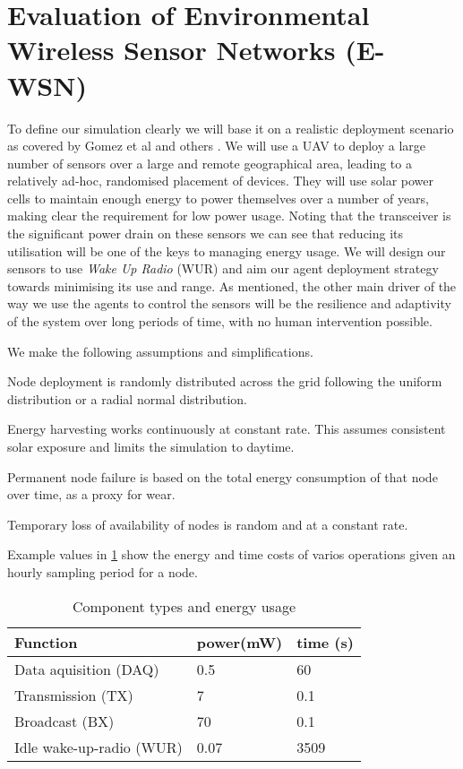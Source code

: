 \section{Evaluation of Environmental Wireless Sensor Networks (E-WSN)}
\label{section:experimental}	

To define our simulation clearly we will base it on a realistic deployment scenario as covered by Gomez et al \cite{Gomez} and others \cite{Jha2016, Avram}. We will use a UAV to deploy a large number of sensors over a large and remote geographical area, leading to a relatively ad-hoc, randomised placement of devices. They will use solar power cells to maintain enough energy to power themselves over a number of years, making clear the requirement for low power usage. Noting that the transceiver is the significant power drain on these sensors we can see that reducing its utilisation will be one of the keys to managing energy usage. We will design our sensors to use \textit{Wake Up Radio} (WUR) and aim our agent deployment strategy towards minimising its use and range. As mentioned, the other main driver of the way we use the agents to control the sensors will be the resilience and adaptivity of the system over long periods of time, with no human intervention possible. 

We make the following assumptions and simplifications.
\begin{itemize}{
		\item Node deployment is randomly distributed across the grid following the uniform distribution or a radial normal distribution.
		\item Energy harvesting works continuously at constant rate. This assumes consistent solar exposure and limits the simulation to daytime.
		\item Permanent node failure is based on the total energy consumption of that node over time, as a proxy for wear.
		\item Temporary loss of availability of nodes is random and at a constant rate.
	}
\end{itemize}




Example values in \ref{table:components_energy_usage} show the energy and time costs of varios operations given an hourly sampling period for a node.


\begin{table}[h]
	\begin{tabular}{p{}p{} p{} }
		\hline
		Function & power(mW) & time (s) \\
		\hline
		Data aquisition (DAQ) & 0.5 & 60 \\
		Transmission (TX) & 7 & 0.1 \\
		Broadcast (BX) & 70 & 0.1 \\
		Idle wake-up-radio (WUR) & 0.07 & 3509 \\
	\end{tabular}
	\caption{Component types and energy usage}
	\label{table:components_energy_usage}
\end{table}


